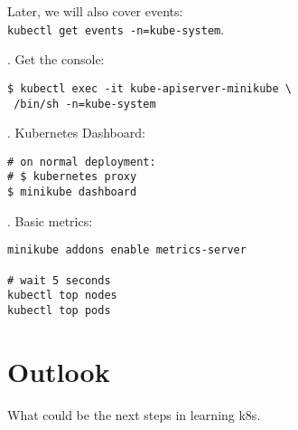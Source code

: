 \documentclass[12pt, letterpaper]{article}
\begin{document}
Later, we will also cover events:\\
\texttt{kubectl get events -n=kube-system}.

. Get the console:

\begin{verbatim}
$ kubectl exec -it kube-apiserver-minikube \
 /bin/sh -n=kube-system
\end{verbatim}

. Kubernetes Dashboard:

\begin{verbatim}
# on normal deployment:
# $ kubernetes proxy
$ minikube dashboard
\end{verbatim}

. Basic metrics:

\begin{verbatim}
minikube addons enable metrics-server

# wait 5 seconds
kubectl top nodes
kubectl top pods
\end{verbatim}


\section{Outlook}
What could be the next steps in learning k8s.
\end{document}
